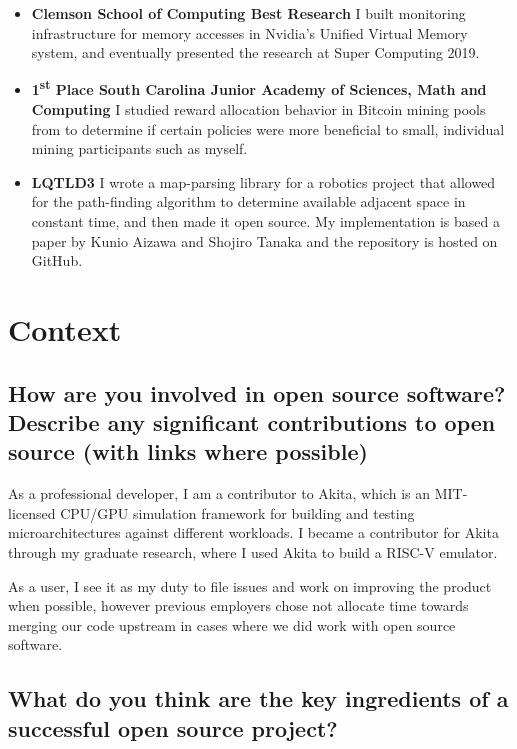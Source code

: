 \documentclass{article}
\begin{document}
\begin{itemize}
  \item \textbf{Clemson School of Computing Best Research}  I built monitoring infrastructure for
        memory accesses in Nvidia's Unified Virtual Memory system, and eventually
        presented the research at Super Computing 2019.
  \item \textbf{1\textsuperscript{st} Place South Carolina Junior Academy of Sciences, Math
          and Computing} I studied reward allocation behavior in Bitcoin mining pools
        from to determine if certain policies were more beneficial to
        small, individual mining participants such as myself.
  \item \textbf{LQTLD3} I wrote a map-parsing library for a robotics project
        that allowed for the path-finding algorithm to determine available adjacent
        space in constant time, and then made it open source. My implementation is based
        a paper by Kunio Aizawa and Shojiro Tanaka\cite{4538229} and the repository is hosted
        on GitHub.

\end{itemize}
\section{Context}
\subsection{How are you involved in open source software? Describe any
  significant contributions to open source (with links where possible)}

As a professional developer, I am a contributor to Akita\cite{akita}, which is
an MIT-licensed CPU/GPU simulation framework for building and testing
microarchitectures against different workloads. I became a contributor for Akita
through my graduate research, where I used Akita to build a RISC-V emulator.

As a user, I see it as my duty to file issues and work on improving the product
when possible, however previous employers chose not allocate time towards
merging our code upstream in cases where we did work with open source software.

\subsection{What do you think are the key ingredients of a successful open
  source project?}
\end{document}

